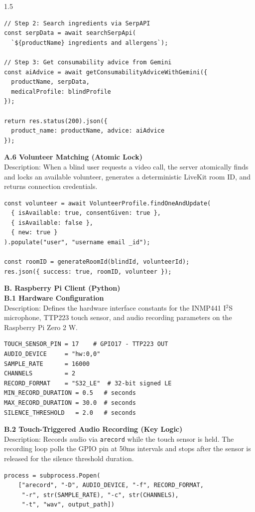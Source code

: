 \begin{spacing}{1.5}
\begin{verbatim}
// Step 2: Search ingredients via SerpAPI
const serpData = await searchSerpApi(
  `${productName} ingredients and allergens`);

// Step 3: Get consumability advice from Gemini
const aiAdvice = await getConsumabilityAdviceWithGemini({
  productName, serpData,
  medicalProfile: blindProfile
});

return res.status(200).json({
  product_name: productName, advice: aiAdvice
});
\end{verbatim}

\noindent \textbf{A.6 Volunteer Matching (Atomic Lock)}\\
Description: When a blind user requests a video call, the server atomically finds and locks an available volunteer, generates a deterministic LiveKit room ID, and returns connection credentials.
\begin{verbatim}
const volunteer = await VolunteerProfile.findOneAndUpdate(
  { isAvailable: true, consentGiven: true },
  { isAvailable: false },
  { new: true }
).populate("user", "username email _id");

const roomID = generateRoomId(blindId, volunteerId);
res.json({ success: true, roomID, volunteer });
\end{verbatim}
\thispagestyle{empty}

\noindent \textbf{B. Raspberry Pi Client (Python)}\\

\noindent \textbf{B.1 Hardware Configuration}\\
Description: Defines the hardware interface constants for the INMP441 I$^2$S microphone, TTP223 touch sensor, and audio recording parameters on the Raspberry Pi Zero 2 W.
\begin{verbatim}
TOUCH_SENSOR_PIN = 17    # GPIO17 - TTP223 OUT
AUDIO_DEVICE     = "hw:0,0"
SAMPLE_RATE      = 16000
CHANNELS         = 2
RECORD_FORMAT    = "S32_LE"  # 32-bit signed LE
MIN_RECORD_DURATION = 0.5   # seconds
MAX_RECORD_DURATION = 30.0  # seconds
SILENCE_THRESHOLD   = 2.0   # seconds
\end{verbatim}

\noindent \textbf{B.2 Touch-Triggered Audio Recording (Key Logic)}\\
Description: Records audio via \texttt{arecord} while the touch sensor is held. The recording loop polls the GPIO pin at 50ms intervals and stops after the sensor is released for the silence threshold duration.
\begin{verbatim}
process = subprocess.Popen(
    ["arecord", "-D", AUDIO_DEVICE, "-f", RECORD_FORMAT,
     "-r", str(SAMPLE_RATE), "-c", str(CHANNELS),
     "-t", "wav", output_path])


\end{verbatim}
\end{spacing}
